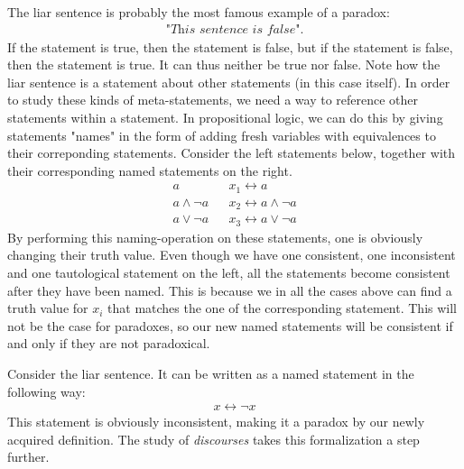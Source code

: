 The liar sentence is probably the most famous example of a paradox:
\begin{align}
  \textit{"This sentence is false"}.
\end{align}
If the statement is true, then the statement is false, but if the statement is false, then the statement is true.
It can thus neither be true nor false.
Note how the liar sentence is a statement about other statements (in this case itself).
In order to study these kinds of meta-statements, we need a way to reference other statements within a statement.
In propositional logic, we can do this by giving statements "names" in the form of adding fresh variables with equivalences to their correponding statements.
Consider the left statements below, together with their corresponding named statements on the right.
\begin{align}
  a               && x_1 \leftrightarrow a\\
  a \wedge \neg a && x_2 \leftrightarrow a \wedge \neg a\\
  a \vee \neg a   && x_3 \leftrightarrow a \vee \neg a
\end{align}
By performing this naming-operation on these statements, one is obviously changing their truth value.
Even though we have one consistent, one inconsistent and one tautological statement on the left, all the statements become consistent after they have been named.
This is because we in all the cases above can find a truth value for $x_i$ that matches the one of the corresponding statement.
This will not be the case for paradoxes, so our new named statements will be consistent if and only if they are not paradoxical.

Consider the liar sentence.  It can be written as a named statement in the following way:
\begin{align}
  x \leftrightarrow \neg x
\end{align}
This statement is obviously inconsistent, making it a paradox by our newly acquired definition.  The study of \textit{discourses} takes this formalization a step further.
